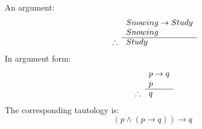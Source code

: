 \begin{example}
    An argument:
    \begin{equation*}
        \begin{array}{r l}
                       & Snowing \rightarrow Study \\
                       & Snowing                   \\
            \cline{2-2}
            \therefore & Study
        \end{array}
    \end{equation*}
    In argument form:
    \begin{equation*}
        \begin{array}{r l}
                       & p \rightarrow q \\
                       & p               \\
            \cline{2-2}
            \therefore & q
        \end{array}
    \end{equation*}
    The corresponding tautology is:
    \begin{equation*}
        (p \land (p \rightarrow q)) \rightarrow q
    \end{equation*}
\end{example}

